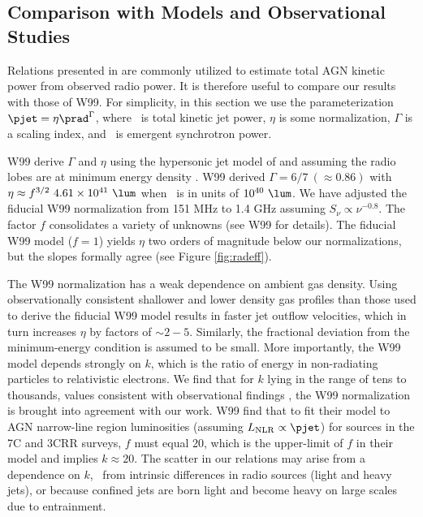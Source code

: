 \documentclass{emulateapj}
\begin{document}
\subsection{Comparison with Models and Observational Studies}
\label{sec:models}

Relations presented in \citet[][hereafter W99]{w99} are commonly
utilized to estimate total AGN kinetic power from observed radio
power. It is therefore useful to compare our results with those of
W99. For simplicity, in this section we use the parameterization
$\pjet = \eta \prad^{\Gamma}$, where \pjet\ is total kinetic jet
power, $\eta$ is some normalization, $\Gamma$ is a scaling index, and
\prad\ is emergent synchrotron power.

W99 derive $\Gamma$ and $\eta$ using the hypersonic jet model of
\citet{1991MNRAS.250..581F} and assuming the radio lobes are at
minimum energy density \citep[see][for
  details]{1980ARA&A..18..165M}. W99 derived $\Gamma = 6/7 ~(\approx
0.86)$ with $\eta \approx f^{3/2}~4.61 \times 10^{41} ~\lum$ when
\prad\ is in units of $10^{40} ~\lum$. We have adjusted the fiducial
W99 normalization from 151 MHz to 1.4 GHz assuming $S_{\nu} \propto
\nu^{-0.8}$. The factor $f$ consolidates a variety of unknowns (see
W99 for details). The fiducial W99 model ($f=1$) yields $\eta$ two
orders of magnitude below our normalizations, but the slopes formally
agree (see Figure \ref{fig:radeff}).

The W99 normalization has a weak dependence on ambient gas density.
Using observationally consistent shallower and lower density gas
profiles than those used to derive the fiducial W99 model results in
faster jet outflow velocities, which in turn increases $\eta$ by
factors of $\sim 2-5$. Similarly, the fractional deviation from the
minimum-energy condition is assumed to be small. More importantly, the
W99 model depends strongly on $k$, which is the ratio of energy in
non-radiating particles to relativistic electrons. We find that for
$k$ lying in the range of tens to thousands, values consistent with
observational findings \citep{2005MNRAS.364.1343D,
  2006MNRAS.372.1741D, 2006ApJ...648..200D, birzan08}, the W99
normalization is brought into agreement with our work. W99 find that
to fit their model to AGN narrow-line region luminosities (assuming
$L_{\mathrm{NLR}} \propto \pjet$) for sources in the 7C and 3CRR
surveys, $f$ must equal 20, which is the upper-limit of $f$ in their
model and implies $k \approx 20$. The scatter in our relations may
arise from a dependence on $k$, \ie\ from intrinsic differences in
radio sources (light and heavy jets), or because confined jets are
born light and become heavy on large scales due to entrainment.
\end{document}
